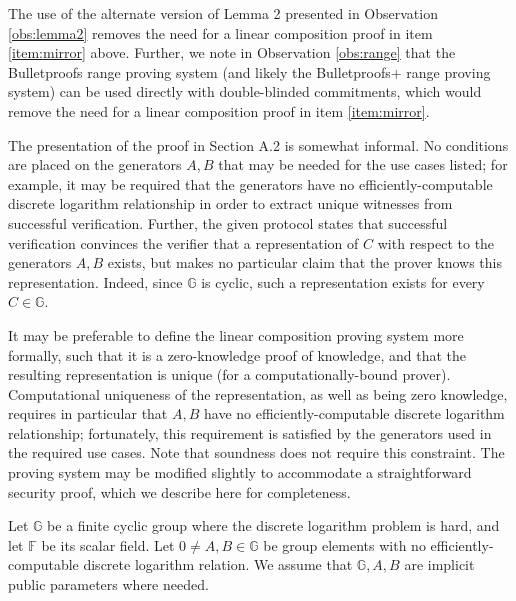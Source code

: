 \documentclass{article}
\newcommand{\G}{\mathbb{G}}
\newcommand{\F}{\mathbb{F}}
\begin{document}
The use of the alternate version of Lemma 2 presented in Observation \ref{obs:lemma2} removes the need for a linear composition proof in item \ref{item:mirror} above.
Further, we note in Observation \ref{obs:range} that the Bulletproofs range proving system (and likely the Bulletproofs+ range proving system) can be used directly with double-blinded commitments, which would remove the need for a linear composition proof in item \ref{item:mirror}.

The presentation of the proof in Section A.2 is somewhat informal.
No conditions are placed on the generators $A,B$ that may be needed for the use cases listed; for example, it may be required that the generators have no efficiently-computable discrete logarithm relationship in order to extract unique witnesses from successful verification.
Further, the given protocol states that successful verification convinces the verifier that a representation of $C$ with respect to the generators $A,B$ exists, but makes no particular claim that the prover knows this representation.
Indeed, since $\G$ is cyclic, such a representation exists for every $C \in \G$.

It may be preferable to define the linear composition proving system more formally, such that it is a zero-knowledge proof of knowledge, and that the resulting representation is unique (for a computationally-bound prover).
Computational uniqueness of the representation, as well as being zero knowledge, requires in particular that $A,B$ have no efficiently-computable discrete logarithm relationship; fortunately, this requirement is satisfied by the generators used in the required use cases.
Note that soundness does not require this constraint.
The proving system may be modified slightly to accommodate a straightforward security proof, which we describe here for completeness.

Let $\G$ be a finite cyclic group where the discrete logarithm problem is hard, and let $\F$ be its scalar field.
Let $0 \neq A,B \in \G$ be group elements with no efficiently-computable discrete logarithm relation.
We assume that $\G,A,B$ are implicit public parameters where needed.
\end{document}
